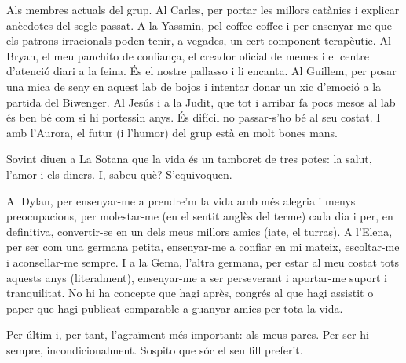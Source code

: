 Als membres actuals del grup. Al Carles, per portar les millors catànies i explicar anècdotes del segle passat. A la Yassmin, pel coffee-coffee i per ensenyar-me que els patrons irracionals poden tenir, a vegades, un cert component terapèutic. Al Bryan, el meu panchito de confiança, el creador oficial de memes i el centre d’atenció diari a la feina. És el nostre pallasso i li encanta. Al Guillem, per posar una mica de seny en aquest lab de bojos i intentar donar un xic d’emoció a la partida del Biwenger. Al Jesús i a la Judit, que tot i arribar fa pocs mesos al lab és ben bé com si hi portessin anys. És difícil no passar-s’ho bé al seu costat. I amb l’Aurora, el futur (i l’humor) del grup està en molt bones mans.

Sovint diuen a La Sotana que la vida és un tamboret de tres potes: la salut, l’amor i els diners. I, sabeu què? S’equivoquen.

Al Dylan, per ensenyar-me a prendre’m la vida amb més alegria i menys preocupacions, per molestar-me (en el sentit anglès del terme) cada dia i per, en definitiva, convertir-se en un dels meus millors amics (iate, el turras). A l’Elena, per ser com una germana petita, ensenyar-me a confiar en mi mateix, escoltar-me i aconsellar-me sempre. I a la Gema, l’altra germana, per estar al meu costat tots aquests anys (literalment), ensenyar-me a ser perseverant i aportar-me suport i tranquilitat. No hi ha concepte que hagi après, congrés al que hagi assistit o paper que hagi publicat comparable a guanyar amics per tota la vida. 

Per últim i, per tant, l’agraïment més important: als meus pares. Per ser-hi sempre, incondicionalment. Sospito que sóc el seu fill preferit.
 
